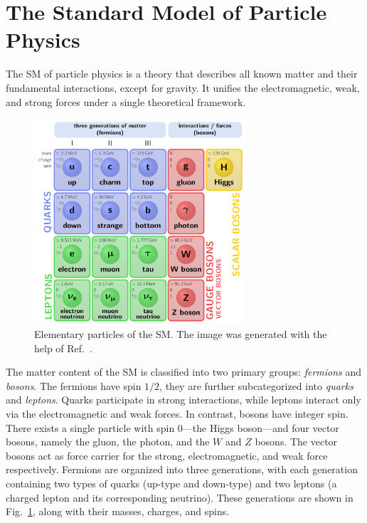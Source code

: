 \section{The Standard Model of Particle Physics} \label{sec:2:EW_symmetry_breaking}
The \acs{SM} of particle physics is a theory that describes all known matter and their fundamental interactions, except for gravity. It unifies the electromagnetic, weak, and strong forces under a single theoretical framework.
\begin{figure}
\centering
\includegraphics[width=0.7\textwidth]{Images/SM.pdf}
\caption{Elementary particles of the \acs{SM}. The image was generated with the help of Ref.~\cite{Neutelings_2024}.}
\label{fig:2:SM}
\end{figure}
The matter content of the \acs{SM} is classified into two primary groups: \textit{fermions} and \textit{bosons}. The fermions have spin $1/2$, they are further subcategorized into \textit{quarks} and \textit{leptons}. Quarks participate in strong interactions, while leptons interact only via the electromagnetic and weak forces. In contrast, bosons have integer spin. There exists a single particle with spin 0---the Higgs boson---and four vector bosons, namely the gluon, the photon, and the $W$ and $Z$ bosons. The vector bosons act as force carrier for the strong, electromagnetic, and weak force respectively. Fermions are organized into three generations, with each generation containing two types of quarks (up-type and down-type) and two leptons (a charged lepton and its corresponding neutrino). These generations are shown in Fig.~\ref{fig:2:SM}, along with their masses, charges, and spins.

